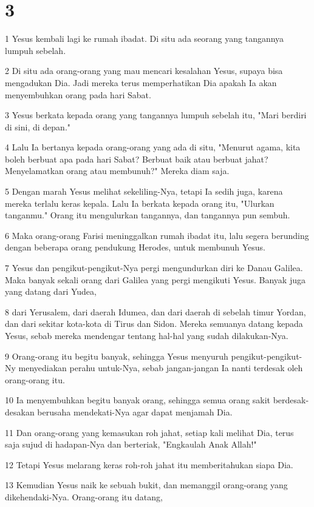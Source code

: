 \chapter{3}

\par 1 Yesus kembali lagi ke rumah ibadat. Di situ ada seorang yang tangannya lumpuh sebelah.
\par 2 Di situ ada orang-orang yang mau mencari kesalahan Yesus, supaya bisa mengadukan Dia. Jadi mereka terus memperhatikan Dia apakah Ia akan menyembuhkan orang pada hari Sabat.
\par 3 Yesus berkata kepada orang yang tangannya lumpuh sebelah itu, "Mari berdiri di sini, di depan."
\par 4 Lalu Ia bertanya kepada orang-orang yang ada di situ, "Menurut agama, kita boleh berbuat apa pada hari Sabat? Berbuat baik atau berbuat jahat? Menyelamatkan orang atau membunuh?" Mereka diam saja.
\par 5 Dengan marah Yesus melihat sekeliling-Nya, tetapi Ia sedih juga, karena mereka terlalu keras kepala. Lalu Ia berkata kepada orang itu, "Ulurkan tanganmu." Orang itu mengulurkan tangannya, dan tangannya pun sembuh.
\par 6 Maka orang-orang Farisi meninggalkan rumah ibadat itu, lalu segera berunding dengan beberapa orang pendukung Herodes, untuk membunuh Yesus.
\par 7 Yesus dan pengikut-pengikut-Nya pergi mengundurkan diri ke Danau Galilea. Maka banyak sekali orang dari Galilea yang pergi mengikuti Yesus. Banyak juga yang datang dari Yudea,
\par 8 dari Yerusalem, dari daerah Idumea, dan dari daerah di sebelah timur Yordan, dan dari sekitar kota-kota di Tirus dan Sidon. Mereka semuanya datang kepada Yesus, sebab mereka mendengar tentang hal-hal yang sudah dilakukan-Nya.
\par 9 Orang-orang itu begitu banyak, sehingga Yesus menyuruh pengikut-pengikut-Ny menyediakan perahu untuk-Nya, sebab jangan-jangan Ia nanti terdesak oleh orang-orang itu.
\par 10 Ia menyembuhkan begitu banyak orang, sehingga semua orang sakit berdesak-desakan berusaha mendekati-Nya agar dapat menjamah Dia.
\par 11 Dan orang-orang yang kemasukan roh jahat, setiap kali melihat Dia, terus saja sujud di hadapan-Nya dan berteriak, "Engkaulah Anak Allah!"
\par 12 Tetapi Yesus melarang keras roh-roh jahat itu memberitahukan siapa Dia.
\par 13 Kemudian Yesus naik ke sebuah bukit, dan memanggil orang-orang yang dikehendaki-Nya. Orang-orang itu datang,
